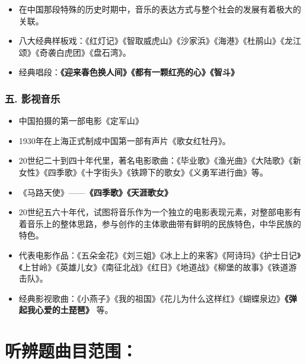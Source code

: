 \documentclass[
]{article}
\begin{document}
\begin{itemize}
\item
  在中国那段特殊的历史时期中，音乐的表达方式与整个社会的发展有着极大的关联。
\item
  八大经典样板戏：《红灯记》《智取威虎山》《沙家浜》《海港》《杜鹃山》《龙江颂》《奇袭白虎团》《盘石湾》。
\item
  经典唱段：\textbf{《迎来春色换人间》《都有一颗红亮的心》《智斗》}
\end{itemize}

\subsubsection{五. 影视音乐}\label{ux4e94.-ux5f71ux89c6ux97f3ux4e50}

\begin{itemize}
\item
  中国拍摄的第一部电影《定军山》
\item
  1930年在上海正式制成中国第一部有声片《歌女红牡丹》。
\item
  20世纪二十到四十年代里，著名电影歌曲：《毕业歌》《渔光曲》《大陆歌》《新女性》《四季歌》《十字街头》《铁蹄下的歌女》《义勇军进行曲》等。
\item
  《马路天使》------\textbf{《四季歌》《天涯歌女》}
\item
  20世纪五六十年代，试图将音乐作为一个独立的电影表现元素，对整部电影有着音乐上的整体思路，参与创作的主体歌曲带有鲜明的民族特色，中华民族的特色。
\item
  代表电影作品：《五朵金花》《刘三姐》《冰上上的来客》《阿诗玛》《护士日记》《上甘岭》《英雄儿女》《南征北战》《红日》《地道战》《柳堡的故事》《铁道游击队》。
\item
  经典影视歌曲：《小燕子》《我的祖国》《花儿为什么这样红》《蝴蝶泉边》\textbf{《弹起我心爱的土琵琶》}
  等。
\end{itemize}

\section{听辨题曲目范围：}\label{ux542cux8fa8ux9898ux66f2ux76eeux8303ux56f4}
\end{document}

